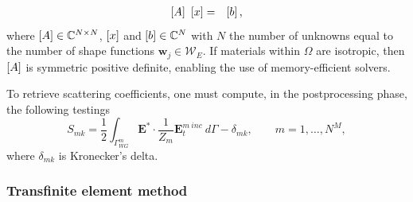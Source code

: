 \begin{eqnarray}
\label{eq:inSystem}
\left[A\right] \ \left[{{x}}\right]  & = & \left[{{b}}\right],
\end{eqnarray} where $\left[A\right] \in \mathbb{C}^{N \times N}$, $\left[{{x}}\right]$ and $\left[{{b}}\right] \in \mathbb{C}^{N}$ with $N$ the number of unknowns equal to the number of shape functions $\mathbf{w}_j \in \mathcal{W}_E$. If materials within $\Omega$ are isotropic, then $\left[A\right]$ is symmetric positive definite, enabling the use of memory-efficient solvers.

To retrieve scattering coefficients, one must compute, in the postprocessing phase, the following testings
$$S_{mk} = \frac{1}{2} \int_{\Gamma_{WG}^m}  \mathbf{E}^* \cdot \frac{1}{Z_m} \mathbf{E}_t^{m \ inc} \ d\Gamma - \delta_{mk}, \qquad m = 1, \ldots,  N^M,$$
\noindent where $\delta_{mk}$ is Kronecker's delta.

\subsubsection*{Transfinite element method}

